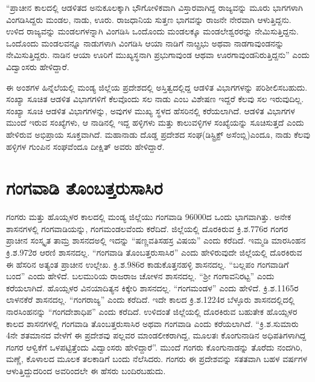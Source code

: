 “ಪ್ರಾಚೀನ ಕಾಲದಲ್ಲಿ ಆಡಳಿತದ ಅನುಕೂಲಕ್ಕಾಗಿ ಭೌಗೋಳಿಕವಾಗಿ ವಿಸ್ತಾರವಾಗಿದ್ದ ರಾಜ್ಯವನ್ನು ಮೂರು ಭಾಗಗಳಾಗಿ ವಿಂಗಡಿಸಿದ್ದರು ಮಂಡಲ, ನಾಡು, ಊರು. ರಾಜಧಾನಿಯ ಸುತ್ತಣ ಭಾಗವನ್ನು ರಾಜನೇ ನೇರವಾಗಿ ಆಳುತ್ತಿದ್ದನು. ಉಳಿದ ರಾಜ್ಯವನ್ನು ಮಂಡಲಗಳನ್ನಾಗಿ ವಿಂಗಡಿಸಿ ಒಂದೊಂದು ಮಂಡಲಕ್ಕೂ ಮಂಡಲೇಶ್ವರರನ್ನು ನೇಮಿಸುತ್ತಿದ್ದನು. ಒಂದೊಂದು ಮಂಡಲವನ್ನೂ ನಾಡುಗಳಾಗಿ ವಿಂಗಡಿಸಿ ಆಯಾ ನಾಡಿಗೆ ನಾೞ್ಪ್ರಭು ಅಥವಾ ನಾಡಗಾವುಂಡನನ್ನು ನೇಮಿಸು\-ತ್ತಿದ್ದರು. ನಾಡಿನ ಆಯಾ ಊರಿಗೆ ಮುಖ್ಯಸ್ಥನಾಗಿ ಪ್ರಭುಗಾವುಂಡ ಆಥವಾ ಊರಗಾವುಂಡನಿರುತ್ತಿದ್ದನು” ಎಂದು ವಿದ್ವಾಂಸರು ಹೇಳಿದ್ದಾರೆ.

ಈ ಅಂಶಗಳ ಹಿನ್ನೆಲೆಯಲ್ಲಿ ಮಂಡ್ಯ ಜಿಲ್ಲೆಯ ಪ್ರದೇಶದಲ್ಲಿ ಅಸ್ತಿತ್ವದಲ್ಲಿದ್ದ ಆಡಳಿತ ವಿಭಾಗಗಳನ್ನು ಪರಿಶೀಲಿಸ\-ಬಹುದು. ಸಂಖ್ಯಾ ಸೂಚಿತ ಆಡಳಿತ ವಿಭಾಗಗಳಿಗೆ ಕೆಲವೊಂದು ಸಲ ನಾಡು ಎಂಬ ವಿಶೇಷಣ ಇದ್ದರೆ ಕೆಲವು ಸಲ ಇರುವುದಿಲ್ಲ. ಸಂಖ್ಯಾ ಸೂಚಿ ಆಡಳಿತ ವಿಭಾಗಗಳನ್ನು, ಅವುಗಳ ಮುಖ್ಯ ಸ್ಥಳದ ಹೆಸರಿನಲ್ಲಿ ಕರೆಯಲಾಗಿದೆ. ಆಡಳಿತ ವಿಭಾಗಗಳ ಮುಂದೆ ಇರುವ ಸಂಖ್ಯೆಗಳು, ಆ ನಾಡಿನಲ್ಲಿ ಇದ್ದ ಹಳ್ಳಿಗಳು ಮತ್ತು ಕಾಲುವಳ್ಳಿಗಳ ಸಂಖ್ಯೆಯನ್ನು ಸೂಚಿಸುತ್ತದೆ ಎಂದು ಹೇಳಿರುವ ಅಭಿಪ್ರಾಯ ಸೂಕ್ತವಾಗಿದೆ. ಮಹಾನಾಡು ದೊಡ್ಡ ಪ್ರದೇಶದ ಸಂಘ(ಡಿಸ್ಟ್ರಿಕ್ಟ್​ ಅಸೆಂಬ್ಲಿ)ಎಂದೂ, ನಾಡು ಕೆಲವು ಹಳ್ಳಿಗಳ ಗುಂಪಿನ ಸಂಘವೆಂದೂ ದೀಕ್ಷಿತ್​ ಅವರು ಹೇಳಿದ್ದಾರೆ.


\section{ಗಂಗವಾಡಿ ತೊಂಬತ್ತರುಸಾಸಿರ}

ಗಂಗರು ಮತ್ತು ಹೊಯ್ಸಳರ ಕಾಲದಲ್ಲಿ ಮಂಡ್ಯ ಜಿಲ್ಲೆಯು ಗಂಗವಾಡಿ 96000ದ ಒಂದು ಭಾಗವಾಗಿತ್ತು. ಅನೇಕ ಶಾಸನಗಳಲ್ಲಿ ಗಂಗವಾಡಿಯನ್ನು, ಗಂಗಮಂಡಲವೆಂದು ಕರೆದಿದೆ. ಜಿಲ್ಲೆಯಲ್ಲಿ ದೊರಕಿರುವ ಕ್ರಿ.ಶ.776ರ ಗಂಗರ ಪ್ರಾಚೀನ ಸಂಸ್ಕೃತ ತಾಮ್ರ ಶಾಸನದಅಲ್ಲಿ ಇದನ್ನು “ಷಣ್ಣವತಿಸಹಸ್ರ ವಿಷಯ” ಎಂದು ಕರೆದಿದೆ. ಇಮ್ಮಡಿ ಮಾರಸಿಂಹನ ಕ್ರಿ.ಶ.972ರ ಆರಣಿ ಶಾಸನದಲ್ಲ. “ಗಂಗವಾಡಿ ತೊಂಬತ್ತರುಸಾಸಿರ” ಎಂದು ಹೇಳಿರುವುದೇ ಜಿಲ್ಲೆಯಲ್ಲಿ ದೊರಕಿರುವ ಈ ಹೆಸರಿನ ಅತ್ಯಂತ ಪ್ರಾಚೀನ ಉಲ್ಲೇಖ. ಕ್ರಿ.ಶ.986ರ ಕಾಡುಕೊತ್ತನಹಳ್ಳಿ ಶಾಸನದಲ್ಲ. “ಬಲ್ಲಪಂ ಗಂಗವಾಡಿಗೆ ಬಂದ” ಎಂದು ಹೇಳಿದೆ. ಬಲಮುರಿಯ ರಾಜರಾಜ ಚೋಳನ ಶಾಸನದಲ್ಲ. “ಶ‍್ರೀ ಗಂಗಾವನಿರಟ್ಟ” ಎಂದು ಕರೆಯಲಾಗಿದೆ. ಹೊಯ್ಸಳರ ವಿನಯಾದಿತ್ಯನ ಕಿಕ್ಕೇರಿ ಶಾಸನದಲ್ಲ. “ಗಂಗಮಂಡಳ” ಎಂದು ಹೇಳಿದೆ. ಕ್ರಿ.ಶ.1165ರ ಲಾಳನಕೆರೆ ಶಾಸನದಲ್ಲ. “ಗಂಗರಾಜ್ಯ” ಎಂದು ಕರೆದಿದೆ. ಇದೇ ಕಾಲದ ಕ್ರಿ.ಶ.1224ರ ಬೆಳ್ಳೂರು ಶಾಸನದಲ್ಲಿದಲ್ಲಿ ನಾರಸಿಂಹನನ್ನು “ಗಂಗದೇಶಾಧಿಪ” ಎಂದು ಕರೆದಿದೆ. ಉಳಿದಂತೆ ಜಿಲ್ಲೆಯಲ್ಲಿ ದೊರಕಿರುವ ಬಹುತೇಕ ಹೊಯ್ಸಳರ ಕಾಲದ ಶಾಸನಗಳಲ್ಲಿ ಗಂಗವಾಡಿ ತೊಂಬತ್ತರುಸಾಸಿರ ಅಥವಾ ಗಂಗವಾಡಿ ಎಂದು ಕರೆಯಲಾಗಿದೆ. “ಕ್ರಿ.ಶ.ಸುಮಾರು 4ನೇ ಶತಮಾನದ ವೇಳೆಗೆ ಈ ಪ್ರದೇಶವು ಪಲ್ಲವರ ಮಾಂಡಲೀಕರಾಗಿದ್ದ, ಮೂಲತಃ ಕೊಂಗುನಾಡಿನ ಅಧಿಪತಿಗಳಾಗಿದ್ದ ಗಂಗರ ಆಳ್ವಿಕೆಗೆ ಒಳಪಟ್ಟಿತ್ತೆಂದು ವಿದ್ವಾಂಸರು ಹೇಳಿದ್ದಾರೆ”. ಮುಂದೆ ಗಂಗರು ಕೊಂಗುನಾಡನ್ನು ತೊರೆದು ನಂದಗಿರಿ, ಮಣ್ಣೆ, ಕೊಳಾಲದ ಮೂಲಕ ತಲಕಾಡಿಗೆ ಬಂದು ನೆಲೆಸಿದರು. ಗಂಗರು ಈ ಪ್ರದೇಶವನ್ನು ಸತತವಾಗಿ ಬಹಳ ವರ್ಷಗಳ ಆಳುತ್ತಿದ್ದುದರಿಂದ ಅವರಿಂದಲೇ ಈ ಹೆಸರು ಬಂದಿರಬಹುದು.

